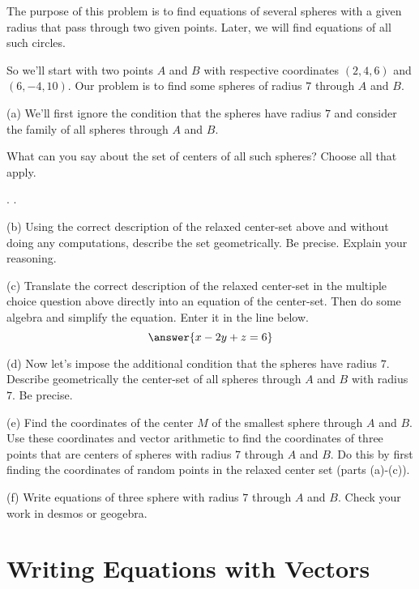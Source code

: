 \documentclass{ximera}
\begin{document}
\begin{question} \label{Q5sdf04r:Vectors}
The purpose of this problem is to find equations of several spheres with a given radius that pass through two given points. Later, we will find equations of all such circles.

So we'll start with two points $A$ and $B$ with respective coordinates $(2,4,6)$ and $(6,-4,10)$. Our problem is to find some spheres of radius $7$ through $A$ and $B$.

(a) We'll first ignore the condition that the spheres have radius $7$ and consider the family of all spheres through $A$ and $B$.

What can you say about the set of centers of all such spheres? Choose all that apply.
\begin{selectAll}
.
.
\end{selectAll}


 (b) Using the correct description of the relaxed center-set above and without doing any computations, describe the set geometrically. Be precise. Explain your reasoning.

(c) Translate the correct description of the relaxed center-set in the multiple choice question above directly into an equation of the center-set. Then do some algebra and simplify the equation. Enter it in the line below.
\[
     \answer{x-2y+z=6}
\]

(d) Now let's impose the additional condition that the spheres have radius $7$. Describe geometrically the center-set of all spheres through $A$ and $B$ with radius $7$. Be precise.

(e) Find the coordinates of the center $M$ of the smallest sphere through $A$ and $B$. Use these coordinates and vector arithmetic to find the coordinates of three points that are centers of spheres with radius $7$ through $A$ and $B$. Do this by first finding the coordinates of random points in the relaxed center set (parts (a)-(c)). 

(f) Write equations of three sphere with radius $7$ through $A$ and $B$. Check your work in desmos or geogebra.

\end{question}




\section{Writing Equations with Vectors}
\end{document}
